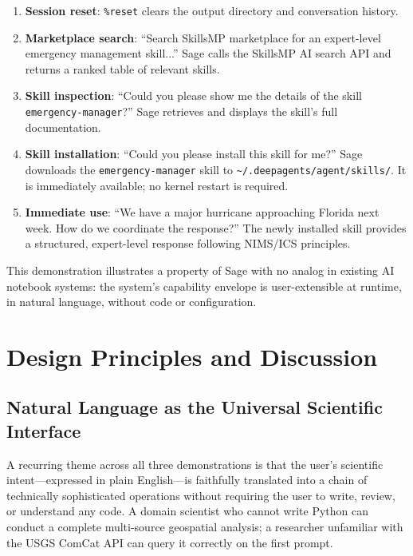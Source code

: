 \documentclass[10pt,twocolumn]{article}
\begin{document}
\begin{enumerate}
  \item \textbf{Session reset}: \texttt{\%reset} clears the output directory and conversation history.
  \item \textbf{Marketplace search}: ``Search SkillsMP marketplace for an expert-level emergency management skill...'' Sage calls the SkillsMP AI search API and returns a ranked table of relevant skills.
  \item \textbf{Skill inspection}: ``Could you please show me the details of the skill \texttt{emergency-manager}?'' Sage retrieves and displays the skill's full documentation.
  \item \textbf{Skill installation}: ``Could you please install this skill for me?'' Sage downloads the \texttt{emergency-manager} skill to \texttt{\textasciitilde/.deepagents/agent/skills/}. It is immediately available; no kernel restart is required.
  \item \textbf{Immediate use}: ``We have a major hurricane approaching Florida next week. How do we coordinate the response?'' The newly installed skill provides a structured, expert-level response following NIMS/ICS principles.
\end{enumerate}

This demonstration illustrates a property of Sage with no analog in existing AI notebook systems: the system's capability envelope is user-extensible at runtime, in natural language, without code or configuration.

\section{Design Principles and Discussion}

\subsection{Natural Language as the Universal Scientific Interface}

A recurring theme across all three demonstrations is that the user's scientific intent---expressed in plain English---is faithfully translated into a chain of technically sophisticated operations without requiring the user to write, review, or understand any code. A domain scientist who cannot write Python can conduct a complete multi-source geospatial analysis; a researcher unfamiliar with the USGS ComCat API can query it correctly on the first prompt.
\end{document}
